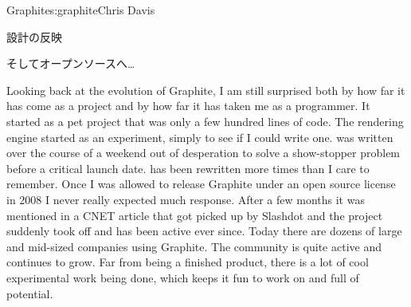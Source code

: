 \begin{aosachapter}{Graphite}{s:graphite}{Chris Davis}
\begin{aosasect1}{設計の反映}
\end{aosasect1}

\begin{aosasect1}{そしてオープンソースへ…}

Looking back at the evolution of Graphite, I am still surprised both by
how far it has come as a project and by how far it has taken me as a
programmer. It started as a pet project that was only a few hundred
lines of code. The rendering engine started as an experiment, simply
to see if I could write one.  was written over the course of a
weekend out of desperation to solve a show-stopper problem before a
critical launch date.  has been rewritten more times than I care
to remember. Once I was allowed to release Graphite under an open
source license in 2008 I never really expected much response. After a
few months it was mentioned in a CNET article that got picked up by
Slashdot and the project suddenly took off and has been active ever
since.  Today there are dozens of large and mid-sized companies using
Graphite. The community is quite active and
continues to grow. Far from being a finished product, there is a lot
of cool experimental work being done, which keeps it fun to work on
and full of potential.

\end{aosasect1}

\end{aosachapter}
